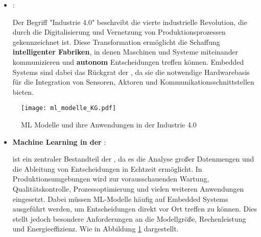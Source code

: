 \begin{itemize}
    \item \textbf{\Iviernull}:

    Der Begriff "Industrie 4.0" beschreibt die vierte industrielle Revolution, die durch die Digitalisierung und Vernetzung 
    von Produktionsprozessen gekennzeichnet ist. Diese Transformation ermöglicht die Schaffung \textbf{intelligenter Fabriken}, 
    in denen Maschinen und Systeme miteinander kommunizieren und \textbf{autonom} Entscheidungen treffen können. Embedded Systems 
    sind dabei das Rückgrat der \Iviernull, da sie die notwendige Hardwarebasis für die Integration von Sensoren, 
    Aktoren und Kommunikationsschnittstellen bieten.
\end{itemize}
\begin{figure}[h]
    \centering
    \texttt{[image: ml\_modelle\_KG.pdf]}
    \caption{ML Modelle und ihre Anwendungen in der Industrie 4.0}
    \label{fig:ml_modelle_KG}
\end{figure}

\begin{itemize}
    \item \textbf{Machine Learning in der \Iviernull}:

    \ML ist ein zentraler Bestandteil der \Iviernull, da es die Analyse großer Datenmengen und die Ableitung 
    von Entscheidungen in Echtzeit ermöglicht. In Produktionsumgebungen wird \ML zur vorausschauenden Wartung, 
    Qualitätskontrolle, Prozessoptimierung \cite{telecom4010011} und vielen weiteren Anwendungen eingesetzt. Dabei müssen ML-Modelle häufig auf 
    Embedded Systems ausgeführt werden, um Entscheidungen direkt vor Ort treffen zu können. Dies stellt jedoch besondere Anforderungen 
    an die Modellgröße, Rechenleistung und Energieeffizienz. Wie in Abbildung \ref{fig:ml_modelle_KG} dargestellt.
\end{itemize}



